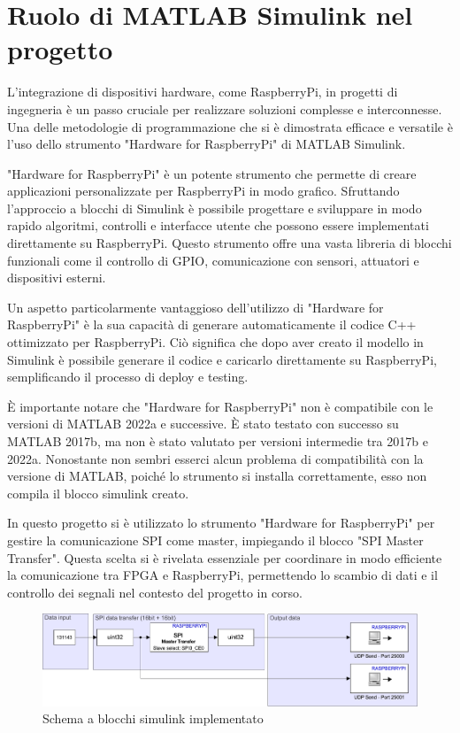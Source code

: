 \documentclass[titlepage]{report}
\begin{document}
	\section*{Ruolo di MATLAB Simulink nel progetto}
	\label{sec:ruolo_simulink}

		L'integrazione di dispositivi hardware, come RaspberryPi, in progetti di ingegneria è un passo cruciale per realizzare soluzioni complesse e interconnesse. Una delle metodologie di programmazione che si è dimostrata efficace e versatile è l'uso dello strumento "Hardware for RaspberryPi" di MATLAB Simulink.

		"Hardware for RaspberryPi" è un potente strumento che permette di creare applicazioni personalizzate per RaspberryPi in modo grafico. Sfruttando l'approccio a blocchi di Simulink è possibile progettare e sviluppare in modo rapido algoritmi, controlli e interfacce utente che possono essere implementati direttamente su RaspberryPi. Questo strumento offre una vasta libreria di blocchi funzionali come il controllo di GPIO, comunicazione con sensori, attuatori e dispositivi esterni. 
		
		Un aspetto particolarmente vantaggioso dell'utilizzo di "Hardware for RaspberryPi" è la sua capacità di generare automaticamente il codice C++ ottimizzato per RaspberryPi. Ciò significa che dopo aver creato il modello in Simulink è possibile generare il codice e caricarlo direttamente su RaspberryPi, semplificando il processo di deploy e testing.
		
		È importante notare che "Hardware for RaspberryPi" non è compatibile con le versioni di MATLAB 2022a e successive. È stato testato con successo su MATLAB 2017b, ma non è stato valutato per versioni intermedie tra 2017b e 2022a. Nonostante non sembri esserci alcun problema di compatibilità con la versione di MATLAB, poiché lo strumento si installa correttamente, esso non compila il blocco simulink creato.

		In questo progetto si è utilizzato lo strumento "Hardware for RaspberryPi" per gestire la comunicazione SPI come master, impiegando il blocco "SPI Master Transfer". Questa scelta si è rivelata essenziale per coordinare in modo efficiente la comunicazione tra FPGA e RaspberryPi, permettendo lo scambio di dati e il controllo dei segnali nel contesto del progetto in corso.

		\begin{figure}[ht]
			\centering
			\includegraphics[scale=0.6]{./img/test_raspi_psed_single.pdf}
			\caption{Schema a blocchi simulink implementato}
			\label{fig:simulink_sch}
		\end{figure}
\end{document}
